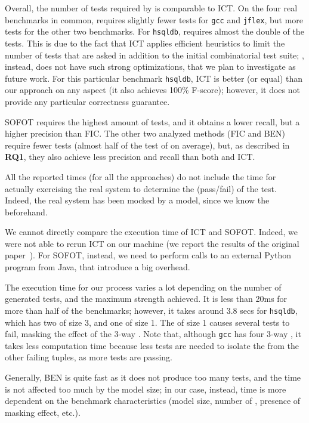 \begin{tikzborder}{\cite{Gargantini16:validation}}
\begin{tikzborder}{\cite{gargantini_combinatorial_2017}}
\begin{tikzborder}{\cite{gargantini_combinatorial_2017}}
\begin{tikzborder}{\cite{garn2019}}
\begin{tikzborder}{\cite{arcaini2019achieving}}
\begin{tikzborder}{}
Overall, the number of tests required by \mix is comparable to ICT. On the four real benchmarks in common, \mix requires slightly fewer tests for \texttt{gcc} and \texttt{jflex}, but more tests for the other two benchmarks. For \texttt{hsqldb}, \mix requires almost the double of the tests. This is due to the fact that ICT applies efficient heuristics to limit the number of tests that are asked in addition to the initial combinatorial test suite; \mix, instead, does not have such strong optimizations, that we plan to investigate as future work. For this particular benchmark \texttt{hsqldb}, ICT is better (or equal) than our approach on any aspect (it also achieves 100\% F-score); however, it does not provide any particular correctness guarantee.

SOFOT requires the highest amount of tests, and it obtains a lower recall, but a higher precision than FIC. The other two analyzed methods (FIC and BEN) require fewer tests (almost half of the test of \mix on average), but, as described in {\bf RQ1}, they also achieve less precision and recall than both \mix and ICT.


All the reported times (for all the approaches) do not include the time for actually exercising the real system to determine the \result (pass/fail) of the test. Indeed, the real system has been mocked by a model, since we know the \truemfics beforehand.

We cannot directly compare the execution time of ICT and SOFOT. Indeed, we were not able to rerun ICT on our machine (we report the results of the original paper~\cite{Niu2018interleaving}). For SOFOT, instead, we need to perform calls to an external Python program from Java, that introduce a big overhead.

The execution time for our process varies a lot depending on the number of generated tests, and the maximum strength achieved. It is less than 20ms for more than half of the benchmarks; however, it takes around 3.8 secs for \texttt{hsqldb}, which has two \truemfics of size 3, and one of size 1. The \mfic of size 1 causes several tests to fail, masking the effect of the 3-way \mfics. Note that, although \texttt{gcc} has four 3-way \truemfics, it takes less computation time because less tests are needed to isolate the \mfics from the other failing tuples, as more tests are passing.

Generally, BEN is quite fast as it does not produce too many tests, and the time is not affected too much by the model size; in our case, instead, time is more dependent on the benchmark characteristics (model size, number of \truemfics, presence of masking effect, etc.).


\end{tikzborder}
\end{tikzborder}
\end{tikzborder}
\end{tikzborder}
\end{tikzborder}
\end{tikzborder}

